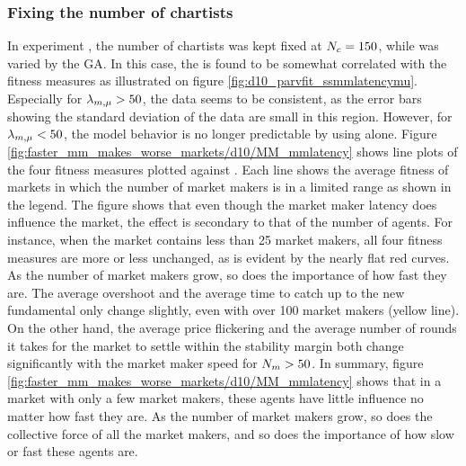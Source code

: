 \subsubsection*{Fixing the number of chartists}
In experiment \dten, the number of chartists was kept fixed at $N_{c} = 150$, while \ssmmnAgents{} was varied by the GA. In this case, the \ssmmlatencymu{} is found to be somewhat correlated with the fitness measures as illustrated on figure \ref{fig:d10_parvfit_ssmmlatencymu}. Especially for $\lambda_{m, \mu} > 50$, the data seems to be consistent, as the error bars showing the standard deviation of the data are small in this region. However, for $\lambda_{m, \mu} < 50$, the model behavior is no longer predictable by using \ssmmlatencymu{} alone. Figure \ref{fig:faster_mm_makes_worse_markets/d10/MM_mmlatency} shows line plots of the four fitness measures plotted against \ssmmlatencymu. Each line shows the average fitness of markets in which the number of market makers is in a limited range as shown in the legend. The figure shows that even though the market maker latency does influence the market, the effect is secondary to that of the number of agents. For instance, when the market contains less than 25 market makers, all four fitness measures are more or less unchanged, as is evident by the nearly flat red curves. As the number of market makers grow, so does the importance of how fast they are. The average overshoot and the average time to catch up to the new fundamental only change slightly, even with over 100 market makers (yellow line). On the other hand, the average price flickering and the average number of rounds it takes for the market to settle within the stability margin both change significantly with the market maker speed for $N_{m} > 50$. In summary, figure \ref{fig:faster_mm_makes_worse_markets/d10/MM_mmlatency} shows that in a market with only a few market makers, these agents have little influence no matter how fast they are. As the number of market makers grow, so does the collective force of all the market makers, and so does the importance of how slow or fast these agents are. 
